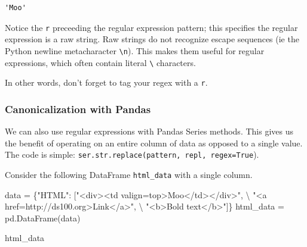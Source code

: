 \documentclass[
  letterpaper,
  DIV=11,
  numbers=noendperiod]{scrreprt}
\newenvironment{Shaded}{\begin{snugshade}}{\end{snugshade}}
\newcommand{\NormalTok}[1]{\textcolor[rgb]{0.00,0.23,0.31}{#1}}
\newcommand{\OperatorTok}[1]{\textcolor[rgb]{0.37,0.37,0.37}{#1}}
\newcommand{\StringTok}[1]{\textcolor[rgb]{0.13,0.47,0.30}{#1}}
\begin{document}
\begin{verbatim}
'Moo'
\end{verbatim}

Notice the \texttt{r} preceeding the regular expression pattern; this
specifies the regular expression is a raw string. Raw strings do not
recognize escape sequences (ie the Python newline metacharacter
\texttt{\textbackslash{}n}). This makes them useful for regular
expressions, which often contain literal \texttt{\textbackslash{}}
characters.

In other words, don't forget to tag your regex with a \texttt{r}.

\hypertarget{canonicalization-with-pandas}{%
\subsubsection{Canonicalization with
Pandas}\label{canonicalization-with-pandas}}

We can also use regular expressions with Pandas Series methods. This
gives us the benefit of operating on an entire column of data as opposed
to a single value. The code is simple:
\texttt{ser.str.replace(pattern,\ repl,\ regex=True}).

Consider the following DataFrame \texttt{html\_data} with a single
column.

\begin{Shaded}
\begin{Highlighting}[]
\NormalTok{data }\OperatorTok{=}\NormalTok{ \{}\StringTok{"HTML"}\NormalTok{: [}\StringTok{"\textless{}div\textgreater{}\textless{}td valign=\textquotesingle{}top\textquotesingle{}\textgreater{}Moo\textless{}/td\textgreater{}\textless{}/div\textgreater{}"}\NormalTok{, }\OperatorTok{\textbackslash{}}
                 \StringTok{"\textless{}a href=\textquotesingle{}http://ds100.org\textquotesingle{}\textgreater{}Link\textless{}/a\textgreater{}"}\NormalTok{, }\OperatorTok{\textbackslash{}}
                 \StringTok{"\textless{}b\textgreater{}Bold text\textless{}/b\textgreater{}"}\NormalTok{]\}}
\NormalTok{html\_data }\OperatorTok{=}\NormalTok{ pd.DataFrame(data)}
\end{Highlighting}
\end{Shaded}

\begin{Shaded}
\begin{Highlighting}[]
\NormalTok{html\_data}
\end{Highlighting}
\end{Shaded}
\end{document}
